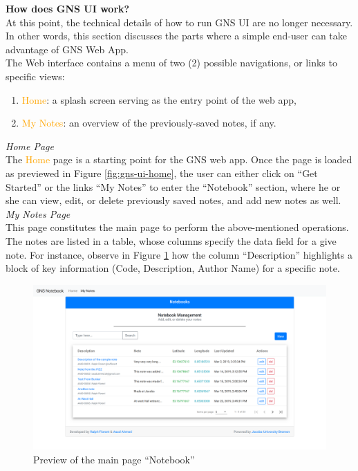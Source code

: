 \noindent
\textbf{How does GNS UI work?}\\
At this point, the technical details of how to run GNS UI are no longer necessary. In other words, this section discusses the parts where a simple end-user can take advantage of GNS Web App.\\

\noindent
The Web interface contains a menu of two (2) possible navigations, or links to specific views:

\begin{enumerate}
    \item \textcolor{orange}{Home}: a splash screen serving as the entry point of the web app,
    \item \textcolor{orange}{My Notes}: an overview of the previously-saved notes, if any.
\end{enumerate}

\noindent
\textit{Home Page}\\
\noindent
The \textcolor{orange}{Home} page is a starting point for the GNS web app. Once the page is loaded as previewed in Figure \ref{fig:gns-ui-home}, the user can either click on “Get Started” or the links “My Notes” to enter the “Notebook” section, where he or she can view, edit, or delete previously saved notes, and add new notes as well.\\

\noindent
\textit{My Notes Page}\\
\noindent
This page constitutes the main page to perform the above-mentioned operations. The notes are listed in a table, whose columns specify the data field for a give note. For instance, observe in Figure \ref{fig:gns-ui-notebooks} how the column “Description” highlights a block of key information (Code, Description, Author Name) for a specific note.\\

\begin{figure}
    \centering
        \includegraphics[width=1\textwidth]{images/screenshots/gns-ui-screenshot_notebooks.png}
        \caption{Preview of the main page “Notebook”}
        \label{fig:gns-ui-notebooks}
\end{figure}

